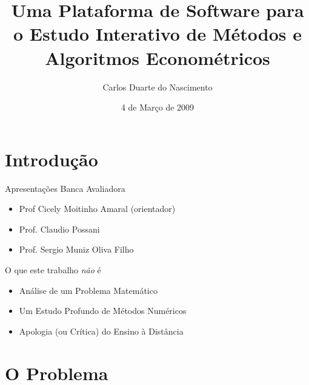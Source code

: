 \documentclass{beamer}
\title[Plataforma para Estudo Interativo de Métodos Econométricos] %
{Uma Plataforma de Software para o Estudo Interativo de Métodos e Algoritmos Econométricos}
\author %
{Carlos Duarte do Nascimento}
\institute[Universidade de São Paulo] %
{
  Instituto de Matemática e Estatística\\
  Universidade de São Paulo
}
\date %
{4 de Março de 2009}
\begin{document}
\begin{frame}
  \titlepage
\end{frame}





\section{Introdução}
\begin{frame}{Apresentações}
	Banca Avaliadora
	\begin{itemize}
			\item{Prof Cicely Moitinho Amaral (orientador)}
			\item{Prof. Claudio Possani}
			\item{Prof. Sergio Muniz Oliva Filho}
	\end{itemize}
\end{frame}

\begin{frame}{O que este trabalho \textit{não} é}
	\begin{itemize}
		\item Análise de um Problema Matemático
		\item Um Estudo Profundo de Métodos Numéricos
		\item Apologia (ou Crítica) do Ensino à Distância
	\end{itemize}
\end{frame}

\section{O Problema}
\end{document}
